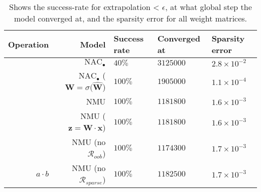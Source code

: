 \begin{table}[H]

\caption{\label{tab:function-task-static-defaults}Shows the success-rate for extrapolation < $\epsilon$, at what global step the model converged at, and the sparsity error for all weight matrices.}
\centering
\begin{tabular}{rrlll}
\toprule
Operation & Model & Success rate & Converged at & Sparsity error\\
\midrule
 & $\mathrm{NAC}_{\bullet}$ & $40\%$ & $3125000$ & $2.8 \times 10^{-2}$\\

 & $\mathrm{NAC}_{\bullet}$ ($\mathbf{W} = \sigma(\mathbf{\hat{W}}$) & $100\%$ & $1905000$ & $1.1 \times 10^{-4}$\\

 & NMU & $100\%$ & $1181800$ & $1.6 \times 10^{-3}$\\

 & NMU ($\mathbf{z} = \mathbf{W} \cdot \mathbf{x}$) & $100\%$ & $1181800$ & $1.6 \times 10^{-3}$\\

 & NMU (no $\mathcal{R}_{oob}$) & $100\%$ & $1174300$ & $1.7 \times 10^{-3}$\\

\multirow{-6}{*}{\raggedleft\arraybackslash ${a \cdot b}$} & NMU (no $\mathcal{R}_{sparse}$) & $100\%$ & $1182500$ & $1.7 \times 10^{-3}$\\
\bottomrule
\end{tabular}
\end{table}
